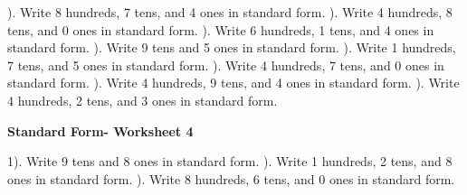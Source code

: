 \documentclass{article}%
\begin{document}
\newline%
\newline%
). Write 8 hundreds, 7 tens, and 4 ones in standard form.%
\newline%
\newline%
). Write 4 hundreds, 8 tens, and 0 ones in standard form.%
\newline%
\newline%
). Write 6 hundreds, 1 tens, and 4 ones in standard form.%
\newline%
\newline%
). Write 9 tens and 5 ones in standard form.%
\newline%
\newline%
). Write 1 hundreds, 7 tens, and 5 ones in standard form.%
\newline%
\newline%
). Write 4 hundreds, 7 tens, and 0 ones in standard form.%
\newline%
\newline%
). Write 4 hundreds, 9 tens, and 4 ones in standard form.%
\newline%
\newline%
). Write 4 hundreds, 2 tens, and 3 ones in standard form.%
\newline%
\newline%
\newline%
\pagebreak%
\large%
\begin{center}%
\textbf{Standard Form- Worksheet 4}%
\newline%
\end{center} \normalsize%
1). Write 9 tens and 8 ones in standard form.%
\newline%
\newline%
). Write 1 hundreds, 2 tens, and 8 ones in standard form.%
\newline%
\newline%
). Write 8 hundreds, 6 tens, and 0 ones in standard form.%
\newline%
\newline%
\end{document}
